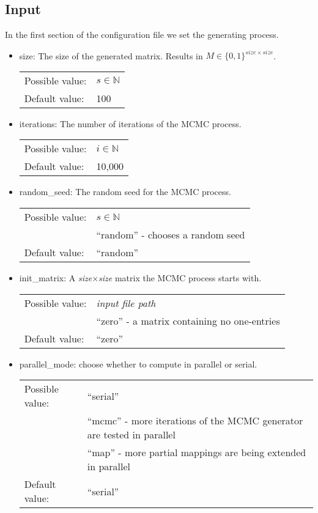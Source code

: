 \subsection{Input}
In the first section of the configuration file we set the generating process.
\begin{itemize}
\item size: The size of the generated matrix. Results in $M\in\{0,1\}^{size\times size}$.

\begin{tabular}{ll}
Possible value: & $s\in\mathbb{N}$ \\
Default value: & 100
\end{tabular}

\item iterations: The number of iterations of the MCMC process.

\begin{tabular}{ll}
Possible value: & $i\in\mathbb{N}$ \\
Default value: & 10,000
\end{tabular}

\item random\_seed: The random seed for the MCMC process.

\begin{tabular}{ll}
Possible value: & $s\in\mathbb{N}$ \\
& ``random'' - chooses a random seed \\
Default value: & ``random''
\end{tabular}

\item init\_matrix: A \textit{size}$\times$\textit{size} matrix the MCMC process starts with.

\begin{tabular}{ll}
Possible value: & \textit{input file path} \\
& ``zero'' - a matrix containing no one-entries \\
Default value: & ``zero''
\end{tabular}

\item parallel\_mode: choose whether to compute in parallel or serial.

\begin{tabular}{ll}
Possible value: & ``serial'' \\
& ``mcmc'' - more iterations of the MCMC generator are tested in parallel \\
& ``map'' - more partial mappings are being extended in parallel \\
Default value: & ``serial''
\end{tabular}


\end{itemize}
